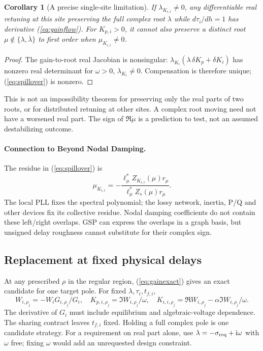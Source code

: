 \documentclass[11pt]{article}
\newtheorem{corollary}[theorem]{Corollary}
\newcommand{\ii}{\mathrm{i}}
\begin{document}
\begin{corollary}[A precise single-site limitation]
If $\lambda_{K_{i,i}}\ne0$, any differentiable real retuning at
this site preserving the full complex root $\lambda$ while
$d\tau_i/dh=1$ has derivative (\ref{eq:gainflow}).
For $K_{p,i}>0$, it cannot also preserve a distinct root
$\mu\notin\{\lambda,\overline\lambda\}$ to first order when
$\mu_{K_{i,i}}\ne0$.
\end{corollary}
\begin{proof}
The gain-to-root real Jacobian is nonsingular:
$\lambda_{K_i}(\lambda\,\delta K_p+\delta K_i)$ has nonzero
real determinant for $\omega>0$, $\lambda_{K_i}\ne0$.
Compensation is therefore unique; (\ref{eq:spillover}) is nonzero.
\end{proof}
This is not an impossibility theorem for preserving only the real
parts of two roots, or for distributed retuning at other sites.
A complex root moving need not have a worsened real part.
The sign of $\Re\dot\mu$ is a prediction to test, not an assumed
destabilizing outcome.

\paragraph{Connection to Beyond Nodal Damping.}
The residue in (\ref{eq:spillover}) is
\[
 \mu_{K_{i,i}}=
 -\frac{\ell_\mu^*Z_{K_{i,i}}(\mu)r_\mu}{\ell_\mu^*Z_s(\mu)r_\mu}.
\]
The local PLL fixes the spectral polynomial; the lossy network,
inertia, P/Q and other devices fix its collective residue.
Nodal damping coefficients do not contain these left/right overlaps.
GSP can express the overlaps in a graph basis, but unsigned delay
roughness cannot substitute for their complex sign.

\subsection{Replacement at fixed physical delays}
At any prescribed $\rho$ in the regular region,
(\ref{eq:gainexact}) gives an exact candidate for one target pole.
For fixed $\lambda,\tau_i,t_{f,i}$,
\[
 W_{i,\rho_j}=-W_iG_{i,\rho_j}/G_i,\quad
 K_{p,i,\rho_j}=\Im W_{i,\rho_j}/\omega,\quad
 K_{i,i,\rho_j}=\Re W_{i,\rho_j}-\alpha\Im W_{i,\rho_j}/\omega .
\]
The derivative of $G_i$ must include equilibrium and algebraic-voltage
dependence. The sharing contract leaves $t_{f,i}$ fixed.
Holding a full complex pole is one candidate strategy.
For a requirement on real part alone, use
$\lambda=-\sigma_{\rm req}+\ii\omega$ with $\omega$ free;
fixing $\omega$ would add an unrequested design constraint.
\end{document}
